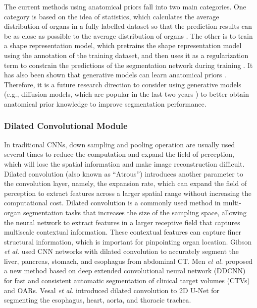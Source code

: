\documentclass[lettersize,journal]{IEEEtran}
\begin{document}
The current methods using anatomical priors fall into two main categories. One category is based on the idea of statistics, which calculates the average distribution of organs in a fully labelled dataset so that the prediction results can be as close as possible to the average distribution of organs \cite{38,55,84,161,162}. The other is to train a shape representation model, which pretrains the shape representation model using the annotation of the training dataset, and then uses it as a regularization term to constrain the predictions of the segmentation network during training \cite{41,155}. It has also been shown that generative models can learn anatomical priors \cite{163}. Therefore, it is a future research direction to consider using generative models (e.g., diffusion models, which are popular in the last two years \cite{164,165}) to better obtain anatomical prior knowledge to improve segmentation performance.

\subsubsection{Dilated Convolutional Module}
In traditional CNNs, down sampling and pooling operation are usually used several times to reduce the computation and expand the field of perception, which will lose the spatial information and make image reconstruction difficult. Dilated convolution (also known as ``Atrous'') introduces another parameter to the convolution layer, namely, the expansion rate, which can expand the field of perception to extract features across a larger spatial range without increasing the computational cost. Dilated convolution is a commonly used method in multi-organ segmentation tasks \cite{54,55,69,88,89} that increases the size of the sampling space, allowing the neural network to extract features in a larger receptive field that captures multiscale contextual information. These contextual features can capture finer structural information, which is important for pinpointing organ location. Gibson {\it{et al.}} \cite{55} used CNN networks with dilated convolution to accurately segment the liver, pancreas, stomach, and esophagus from abdominal CT. Men {\it{et al.}} \cite{58} proposed a new method based on deep extended convolutional neural network (DDCNN) for fast and consistent automatic segmentation of clinical target volumes (CTVs) and OARs. Vesal {\it{et al.}} \cite{88} introduced dilated convolution to 2D U-Net for segmenting the esophagus, heart, aorta, and thoracic trachea.
\end{document}
